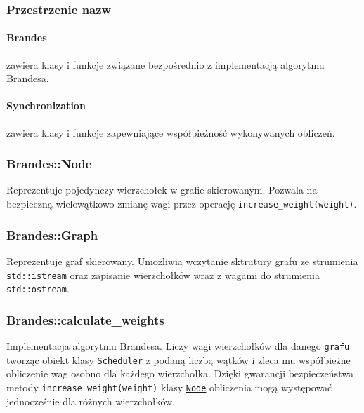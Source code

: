 \documentclass{article}
\begin{document}
      \subsubsection{Przestrzenie nazw}
        \label{namespaces}

        \paragraph{Brandes}
        \label{namespace:brandes}
        zawiera klasy i funkcje związane bezpośrednio z implementacją algorytmu
        Brandesa.

        \paragraph{Synchronization}
        \label{namespace:synchronization}
        zawiera klasy i funkcje zapewniające współbieżność wykonywanych obliczeń.


      \subsubsection{Brandes::Node}
      \label{class:brandes__node}
      Reprezentuje pojedynczy wierzchołek w grafie skierowanym. Pozwala na
      bezpieczną wielowątkowo zmianę wagi przez operację
      \texttt{increase\_weight(weight)}.

      \subsubsection{Brandes::Graph}
      \label{class:brandes__graph}
      Reprezentuje graf skierowany. Umożliwia wczytanie sktrutury grafu ze strumienia
      \texttt{std::istream} oraz zapisanie wierzchołków wraz z wagami do strumienia
      \texttt{std::ostream}.

      \subsubsection{Brandes::calculate\_weights}
      \label{func:brandes__calculate_weights}
      Implementacja algorytmu Brandesa. Liczy wagi wierzchołków dla danego
      \hyperref[class:brandes__graph]{\texttt{grafu}} tworząc obiekt klasy
      \hyperref[class:synchronization__scheduler]{\texttt{Scheduler}} z podaną
      liczbą wątków i zleca mu współbieżne obliczenie wag osobno dla każdego
      wierzchołka. Dzięki gwarancji bezpieczeństwa metody
      \texttt{increase\_weight(weight)} klasy \hyperref[class:brandes__node]
      {\texttt{Node}} obliczenia mogą występować jednocześnie dla różnych
      wierzchołków.
\end{document}
